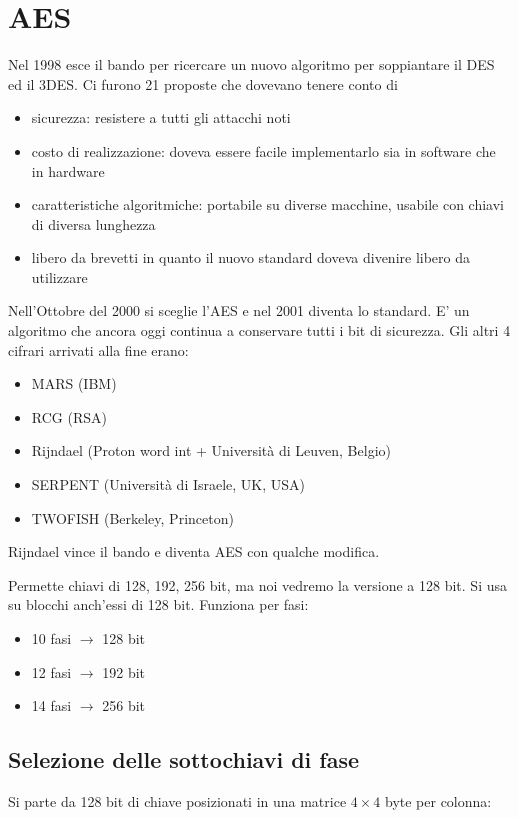 \section{AES}
Nel 1998 esce il bando per ricercare un nuovo algoritmo per soppiantare il DES ed il 3DES.
Ci furono 21 proposte che dovevano tenere conto di
\begin{itemize}
    \item sicurezza: resistere a tutti gli attacchi noti
    \item costo di realizzazione: doveva essere facile implementarlo sia in software che in hardware
    \item caratteristiche algoritmiche: portabile su diverse macchine, usabile con chiavi di diversa lunghezza
    \item libero da brevetti in quanto il nuovo standard doveva divenire libero da utilizzare
\end{itemize}

Nell'Ottobre del 2000 si sceglie l'AES e nel 2001 diventa lo standard.
E' un algoritmo che ancora oggi continua a conservare tutti i bit di sicurezza.
Gli altri 4 cifrari arrivati alla fine erano:
\begin{itemize}
    \item MARS (IBM)
    \item RCG (RSA)
    \item Rijndael (Proton word int + Università di Leuven, Belgio)
    \item SERPENT (Università di Israele, UK, USA)
    \item TWOFISH (Berkeley, Princeton)
\end{itemize}
Rijndael vince il bando e diventa AES con qualche modifica.

Permette chiavi di 128, 192, 256 bit, ma noi vedremo la versione a 128 bit.
Si usa su blocchi anch'essi di 128 bit. Funziona per fasi:
\begin{itemize}
    \item 10 fasi $\xrightarrow{}$ 128 bit
    \item 12 fasi $\xrightarrow{}$ 192 bit
    \item 14 fasi $\xrightarrow{}$ 256 bit
\end{itemize}

\subsection{Selezione delle sottochiavi di fase}
Si parte da 128 bit di chiave posizionati in una matrice $4 \times 4$ byte per colonna:

